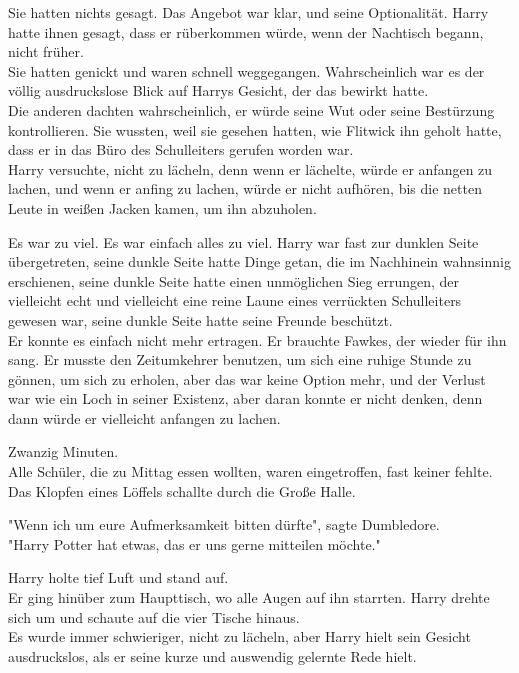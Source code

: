 {Sie hatten nichts gesagt. Das Angebot war klar, und seine Optionalität. Harry hatte ihnen gesagt, dass er rüberkommen würde, wenn der Nachtisch begann, nicht früher.\\ Sie hatten genickt und waren schnell weggegangen. Wahrscheinlich war es der völlig ausdruckslose Blick auf Harrys Gesicht, der das bewirkt hatte.\\ Die anderen dachten wahrscheinlich, er würde seine Wut oder seine Bestürzung kontrollieren. Sie wussten, weil sie gesehen hatten, wie Flitwick ihn geholt hatte, dass er in das Büro des Schulleiters gerufen worden war.\\ Harry versuchte, nicht zu lächeln, denn wenn er lächelte, würde er anfangen zu lachen, und wenn er anfing zu lachen, würde er nicht aufhören, bis die netten Leute in weißen Jacken kamen, um ihn abzuholen.

Es war zu viel. Es war einfach alles zu viel. Harry war fast zur dunklen Seite übergetreten, seine dunkle Seite hatte Dinge getan, die im Nachhinein wahnsinnig erschienen, seine dunkle Seite hatte einen unmöglichen Sieg errungen, der vielleicht echt und vielleicht eine reine Laune eines verrückten Schulleiters gewesen war, seine dunkle Seite hatte seine Freunde beschützt.\\ Er konnte es einfach nicht mehr ertragen. Er brauchte Fawkes, der wieder für ihn sang. Er musste den Zeitumkehrer benutzen, um sich eine ruhige Stunde zu gönnen, um sich zu erholen, aber das war keine Option mehr, und der Verlust war wie ein Loch in seiner Existenz, aber daran konnte er nicht denken, denn dann würde er vielleicht anfangen zu lachen.

Zwanzig Minuten.\\ Alle Schüler, die zu Mittag essen wollten, waren eingetroffen, fast keiner fehlte. Das Klopfen eines Löffels schallte durch die Große Halle.

"Wenn ich um eure Aufmerksamkeit bitten dürfte", sagte Dumbledore.\\ "Harry Potter hat etwas, das er uns gerne mitteilen möchte."

Harry holte tief Luft und stand auf.\\ Er ging hinüber zum Haupttisch, wo alle Augen auf ihn starrten. Harry drehte sich um und schaute auf die vier Tische hinaus.\\ Es wurde immer schwieriger, nicht zu lächeln, aber Harry hielt sein Gesicht ausdruckslos, als er seine kurze und auswendig gelernte Rede hielt.

}
